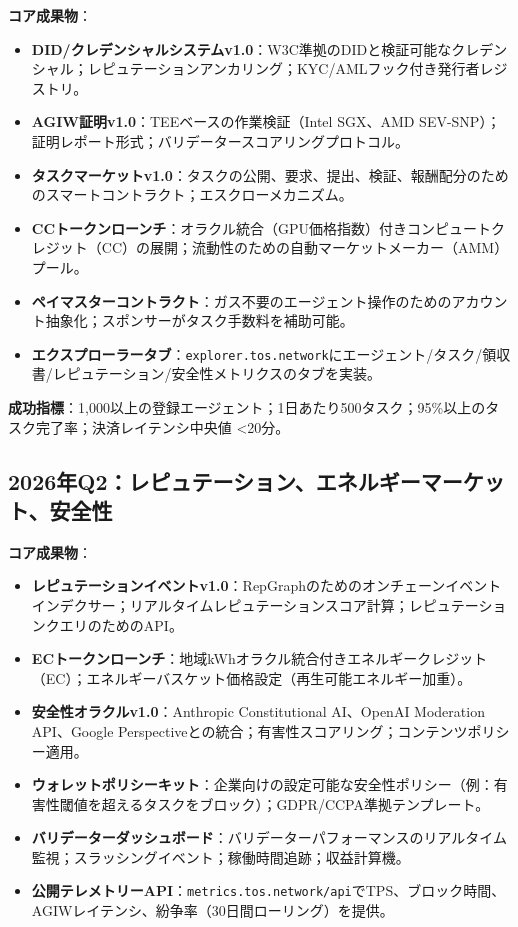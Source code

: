 \documentclass[11pt]{article}
\begin{document}
\textbf{コア成果物}：
\begin{itemize}[noitemsep]
  \item \textbf{DID/クレデンシャルシステムv1.0}：W3C準拠のDIDと検証可能なクレデンシャル；レピュテーションアンカリング；KYC/AMLフック付き発行者レジストリ。
  \item \textbf{AGIW証明v1.0}：TEEベースの作業検証（Intel SGX、AMD SEV-SNP）；証明レポート形式；バリデータースコアリングプロトコル。
  \item \textbf{タスクマーケットv1.0}：タスクの公開、要求、提出、検証、報酬配分のためのスマートコントラクト；エスクローメカニズム。
  \item \textbf{CCトークンローンチ}：オラクル統合（GPU価格指数）付きコンピュートクレジット（CC）の展開；流動性のための自動マーケットメーカー（AMM）プール。
  \item \textbf{ペイマスターコントラクト}：ガス不要のエージェント操作のためのアカウント抽象化；スポンサーがタスク手数料を補助可能。
  \item \textbf{エクスプローラータブ}：\texttt{explorer.tos.network}にエージェント/タスク/領収書/レピュテーション/安全性メトリクスのタブを実装。
\end{itemize}

\textbf{成功指標}：1,000以上の登録エージェント；1日あたり500タスク；95\%以上のタスク完了率；決済レイテンシ中央値 <20分。

\subsection{2026年Q2：レピュテーション、エネルギーマーケット、安全性}

\textbf{コア成果物}：
\begin{itemize}[noitemsep]
  \item \textbf{レピュテーションイベントv1.0}：RepGraphのためのオンチェーンイベントインデクサー；リアルタイムレピュテーションスコア計算；レピュテーションクエリのためのAPI。
  \item \textbf{ECトークンローンチ}：地域kWhオラクル統合付きエネルギークレジット（EC）；エネルギーバスケット価格設定（再生可能エネルギー加重）。
  \item \textbf{安全性オラクルv1.0}：Anthropic Constitutional AI、OpenAI Moderation API、Google Perspectiveとの統合；有害性スコアリング；コンテンツポリシー適用。
  \item \textbf{ウォレットポリシーキット}：企業向けの設定可能な安全性ポリシー（例：有害性閾値を超えるタスクをブロック）；GDPR/CCPA準拠テンプレート。
  \item \textbf{バリデーターダッシュボード}：バリデーターパフォーマンスのリアルタイム監視；スラッシングイベント；稼働時間追跡；収益計算機。
  \item \textbf{公開テレメトリーAPI}：\texttt{metrics.tos.network/api}でTPS、ブロック時間、AGIWレイテンシ、紛争率（30日間ローリング）を提供。
\end{itemize}
\end{document}
